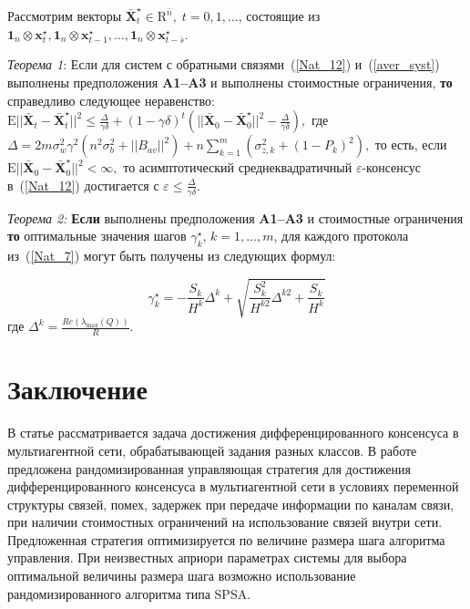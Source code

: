 \documentclass{spisok-article}
\begin{document}
Рассмотрим векторы ${\bar{\mathbf{X}}}^{\star}_t \in {\mathrm R}^{\bar n}, \; t=0,1, \ldots$, состоящие из $ \mathbf{1}_{n} \otimes \mathbf x_t^{\star}, \mathbf{1}_{n}  \otimes  \mathbf  x_{t-1}^{\star}, \ldots,  \mathbf{1}_{n} \otimes  \mathbf x_{t-\bar s}^{\star}$.

\textit{Теорема 1}:
\label{thm}
Если для систем с обратными связями~(\ref{Nat_12}) и~(\ref{aver_syst}) выполнены предположения {\bf A1--A3} и выполнены стоимостные ограничения, {\bf то} справедливо следующее неравенство:
$
 { \mathrm{E}}||{\bar{\mathbf{X}}}_{t} - {\bar{\mathbf{X}}}^{\star}_{t}||^{2} \leq \frac{\Delta}{\gamma \delta} + (1-\gamma \delta)^{t}\left(||{\bar{\mathbf{X}}}_{0} - {\bar{\mathbf{X}}}^{\star}_{0}||^{2} - \frac{\Delta}{\gamma \delta}  \right),
 $
где
$
\Delta =  2m\sigma_w^2 \gamma^2 (n^2\sigma_{b}^2 + ||B_{av}||^2) + n \sum_{k=1}^m (\sigma_{z,k}^2+ (1-P_k)^2), $
то есть, если $\mathrm{E}||{\bar{\mathbf{X}}}_{0} - {\bar{\mathbf{X}}}^{\star}_{0}||^{2} <\infty, $ то асимптотический среднеквадратичный $\varepsilon$-консенсус в~(\ref{Nat_12}) достигается с
$
\varepsilon \leq \frac{\Delta}{\gamma \delta}.
$


\textit{Теорема 2:}
{\bf Если} выполнены предположения {\bf A1--A3} и стоимостные ограничения {\bf то} оптимальные значения шагов $\gamma^{\star}_k$, $k=1,\ldots,m$, для каждого протокола из~(\ref{Nat_7}) могут быть получены из следующих формул:

\begin{equation}
\label{optimal_step_size}
{\gamma_k ^ {\star}} = - \frac{S_k}{H^k} \Delta^k+\sqrt{\frac{S_k^2}{H^{k 2}} \Delta^{k 2}+\frac{S_k}{H^k}}
\end{equation}
где
$\Delta^k = \frac{Re(\lambda_{\max}(Q))}{R}$.


\section{Заключение}
В статье рассматривается задача достижения дифференцированного консенсуса в мультиагентной сети, обрабатывающей задания разных классов.
В работе предложена рандомизированная управляющая стратегия для достижения дифференцированного консенсуса в мультиагентной сети в условиях переменной структуры связей, помех, задержек при передаче информации по каналам связи, при наличии стоимостных ограничений на использование связей внутри сети. Предложенная стратегия оптимизируется по величине размера шага алгоритма управления. При неизвестных априори параметрах системы для выбора оптимальной величины размера шага возможно использование рандомизированного алгоритма типа SPSA.
\end{document}

